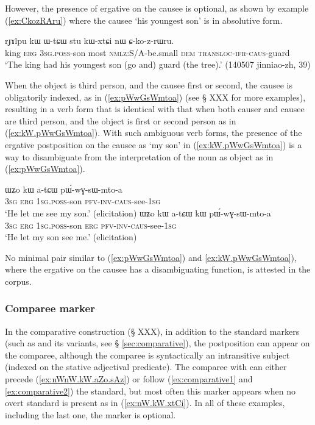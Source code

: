 However, the presence of ergative on the causee is optional, as shown by example (\ref{ex:CkozRAru}) where the causee  `his youngest son' is in absolutive form.

\begin{exe}
\ex \label{ex:CkozRAru}
 \gll rɟɤlpu kɯ ɯ-tɕɯ stu kɯ-xtɕi nɯ ɕ-ko-z-rɯru. \\
 king \textsc{erg} \textsc{3sg}.\textsc{poss}-son most \textsc{nmlz}:S/A-be.small \textsc{dem} \textsc{transloc}-\textsc{ifr}-\textsc{caus}-guard \\
 \glt  `The king had his youngest son (go and) guard (the tree).' (140507 jinniao-zh, 39)
\end{exe}

When the object is third person, and the causee first or second, the causee is obligatorily indexed, as in (\ref{ex:pWwGsWmtoa}) (see § XXX for more examples), resulting in a verb form that is identical with that when both causer and causee are third person, and the object is first or second person as in (\ref{ex:kW.pWwGsWmtoa}). With such ambiguous verb forms, the presence of the ergative postposition on the causee as  `my son' in (\ref{ex:kW.pWwGsWmtoa}) is a way to disambiguate from the interpretation of the noun as object as in (\ref{ex:pWwGsWmtoa}). 

\begin{exe}
\ex
\begin{xlist}
\ex \label{ex:pWwGsWmtoa}
 \gll ɯʑo kɯ a-tɕɯ pɯ́-wɣ-sɯ-mto-a \\
\textsc{3sg} \textsc{erg} \textsc{1sg}.\textsc{poss}-son  \textsc{pfv}-\textsc{inv}-\textsc{caus}-see-\textsc{1sg} \\
\glt `He let me see my son.' (elicitation)
\ex \label{ex:kW.pWwGsWmtoa}
 \gll ɯʑo kɯ a-tɕɯ kɯ pɯ́-wɣ-sɯ-mto-a \\
\textsc{3sg} \textsc{erg} \textsc{1sg}.\textsc{poss}-son \textsc{erg} \textsc{pfv}-\textsc{inv}-\textsc{caus}-see-\textsc{1sg} \\
\glt `He let my son see me.' (elicitation)
\end{xlist}
\end{exe}

No minimal pair similar to (\ref{ex:pWwGsWmtoa}) and \ref{ex:kW.pWwGsWmtoa}), where the ergative on the causee has a disambiguating function, is attested in the corpus.


\subsubsection{Comparee marker} \label{sec:comparee.kW}
In the comparative construction (§ XXX), in addition to the standard markers (such as  and its variants, see § \ref{sec:comparative}), the postposition  can appear on the comparee, although the comparee is syntactically an intransitive subject  (indexed on the stative adjectival predicate). The comparee with   can either precede (\ref{ex:nWnW.kW.aZo.sAz}) or follow (\ref{ex:comparative1} and \ref{ex:comparative2}) the standard, but most often this marker appears when no overt standard is present as in (\ref{ex:nW.kW.xtCi}). In all of these examples, including the last one, the marker    is optional.

